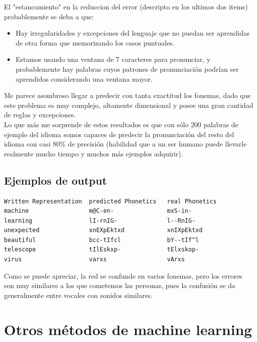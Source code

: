 \documentclass[paper=a4, fontsize=11pt]{scrartcl} %
\numberwithin{equation}{section} %
\numberwithin{figure}{section} %
\numberwithin{table}{section} %
\begin{document}
El "estancamiento" en la reduccion del error (descripto en los ultimos dos items) probablemente se deba a que:

\begin{itemize}
\item Hay irregularidades y excepciones del lenguaje que no puedan ser aprendidas de otra forma que memorizando los casos puntuales.
\item Estamos usando una ventana de 7 caracteres para pronunciar, y probablemente hay palabras cuyos patrones de pronunciación podrían ser aprendidos considerando una ventana mayor.
\end{itemize}


Me parece asombroso llegar a predecir con tanta exactitud los fonemas, dado que este problema es muy complejo, altamente dimensional y posee una gran cantidad de reglas y excepciones. \\

Lo que más me sorprende de estos resultados es que con sólo 200 palabras de ejemplo del idioma somos capaces de predecir la pronunciación del resto del idioma con casi 80\% de precisión (habilidad que a un ser humano puede llevarle realmente mucho tiempo y muchos más ejemplos adquirir). \\


\subsection{Ejemplos de output}

\begin{center}
\begin{BVerbatim}
Written Representation  predicted Phonetics   real Phonetics  
machine                 m@C-en-               mxS-in-  
learning                lI-rnIG-              l--RnIG- 
unexpected              xnEXpEktxd            xnIXpEktxd  
beautiful               bcc-tIfcl             bY--tIf^l 
telescope               tIlEskxp-             tElxskop- 
virus                   varxs                 vArxs

\end{BVerbatim}
\end{center}


Como se puede apreciar, la red se confunde en varios fonemas, pero los errores son muy similares a los que cometemos las personas, pues la confusión se da generalmente entre vocales con sonidos similares. \\
\newpage
\section{ Otros métodos de machine learning }
\end{document}
